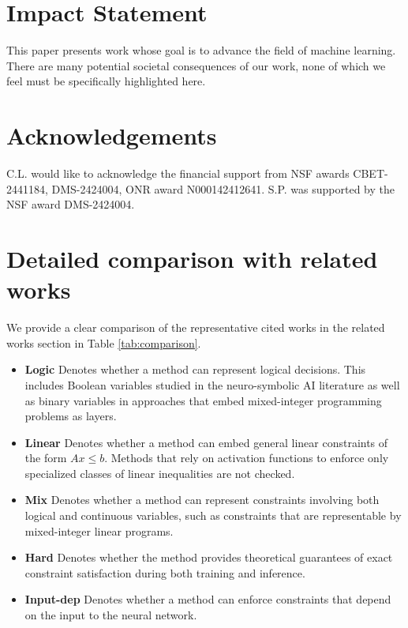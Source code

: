 \documentclass{article}
\theoremstyle{plain}
\theoremstyle{definition}
\theoremstyle{remark}
\begin{document}
\newpage
\section*{Impact Statement}
This paper presents work whose goal is to advance the field of machine learning. There are many potential societal consequences of our work, none of which we feel must be specifically highlighted here.


\section*{Acknowledgements}
C.L. would like to acknowledge the financial support from NSF awards CBET-
2441184, DMS-2424004, ONR award N000142412641. S.P. was supported by the NSF award DMS-2424004. 






\newpage
\appendix
\clearpage
\onecolumn
\section{Detailed comparison with related works}\label{app:litreview}

We provide a clear comparison of the representative cited works in the related works section in Table \ref{tab:comparison}. 
\begin{itemize}
    \item \textbf{Logic} Denotes whether a method can represent logical decisions. This includes Boolean variables studied in the neuro-symbolic AI literature as well as binary variables in approaches that embed mixed-integer programming problems as layers.
    \item \textbf{Linear} Denotes whether a method can embed general linear constraints of the form $Ax \leq b$. Methods that rely on activation functions to enforce only specialized classes of linear inequalities are not checked.
    \item \textbf{Mix} Denotes whether a method can represent constraints involving both logical and continuous variables, such as constraints that are representable by mixed-integer linear programs.
    \item \textbf{Hard} Denotes whether the method provides theoretical guarantees of exact constraint satisfaction during both training and inference.
    \item \textbf{Input-dep} Denotes whether a method can enforce constraints that depend on the input to the neural network.
\end{itemize}
\end{document}
